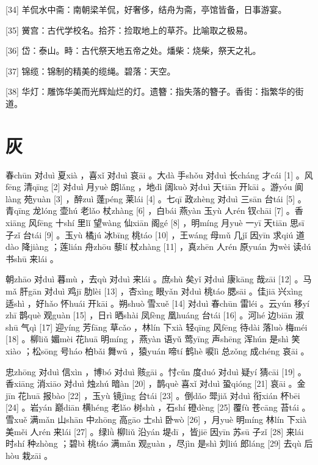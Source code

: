 \documentclass[12pt,UTF8]{ctexbook}
\begin{document}
[34] 羊侃水中斋：南朝梁羊侃，好奢侈，结舟为斋，亭馆皆备，日事游宴。

[35] 黉宫：古代学校名。拾芥：捡取地上的草芥。比喻取之极易。

[36] 岱：泰山。畤：古代祭天地五帝之处。燔柴：烧柴，祭天之礼。

[37] 锦缆：锦制的精美的缆绳。碧落：天空。

[38] 华灯：雕饰华美而光辉灿烂的灯。遗簪：指失落的簪子。香街：指繁华的街道。





\chapter{灰}


春chūn 对duì 夏xià ，喜xǐ 对duì 哀āi 。大dà 手shǒu 对duì 长cháng 才cái [1] 。风fēng 清qīng [2] 对duì 月yuè 朗lǎng ，地dì 阔kuò 对duì 天tiān 开kāi 。游yóu 阆làng 苑yuàn [3] ，醉zuì 蓬péng 莱lái [4] 。七qī 政zhèng 对duì 三sān 台tái [5] 。青qīng 龙lóng 壶hú 老lǎo 杖zhàng [6] ，白bái 燕yàn 玉yù 人rén 钗chāi [7] 。香xiāng 风fēng 十shí 里lǐ 望wàng 仙xiān 阁gé [8] ，明míng 月yuè 一yī 天tiān 思sī 子zǐ 台tái [9] 。玉yù 橘jú 冰bīng 桃táo [10] ，王wáng 母mǔ 几jǐ 因yīn 求qiú 道dào 降jiàng ；莲lián 舟zhōu 藜lí 杖zhàng [11] ，真zhēn 人rén 原yuán 为wèi 读dú 书shū 来lái 。

朝zhāo 对duì 暮mù ，去qù 对duì 来lái 。庶shù 矣yǐ 对duì 康kāng 哉zāi [12] 。马mǎ 肝gān 对duì 鸡jī 肋lèi [13] ，杏xìng 眼yǎn 对duì 桃táo 腮sāi 。佳jiā 兴xìng 适shì ，好hǎo 怀huái 开kāi 。朔shuò 雪xuě [14] 对duì 春chūn 雷léi 。云yún 移yí zhī 鹊què 观guàn [15] ，日rì 晒shài 凤fèng 凰huáng 台tái [16] 。河hé 边biān 淑shū 气qì [17] 迎yíng 芳fāng 草cǎo ，林lín 下xià 轻qīng 风fēng 待dài 落luò 梅méi [18] 。柳liǔ 媚mèi 花huā 明míng ，燕yàn 语yǔ 莺yīng 声shēng 浑hún 是shì 笑xiào ；松sōng 号háo 柏bǎi 舞wǔ ，猿yuán 啼tí 鹤hè 唳lì 总zǒng 成chéng 哀āi 。

忠zhōng 对duì 信xìn ，博bó 对duì 赅gāi 。忖cǔn 度duó 对duì 疑yí 猜cāi [19] 。香xiāng 消xiāo 对duì 烛zhú 暗àn [20] ，鹊què 喜xǐ 对duì 蛩qióng [21] 哀āi 。金jīn 花huā 报bào [22] ，玉yù 镜jìng 台tái [23] 。倒dǎo 斝jiǎ 对duì 衔xián 杯bēi [24] 。岩yán 巅diān 横héng 老lǎo 树shù ，石shí 磴dèng [25] 覆fù 苍cāng 苔tái 。雪xuě 满mǎn 山shān 中zhōng 高gāo 士shì 卧wò [26] ，月yuè 明míng 林lín 下xià 美měi 人rén 来lái [27] 。绿lǜ 柳liǔ 沿yán 堤dī ，皆jiē 因yīn 苏sū 子zǐ [28] 来lái 时shí 种zhòng ；碧bì 桃táo 满mǎn 观guàn ，尽jìn 是shì 刘liú 郎láng [29] 去qù 后hòu 栽zāi 。
\end{document}
